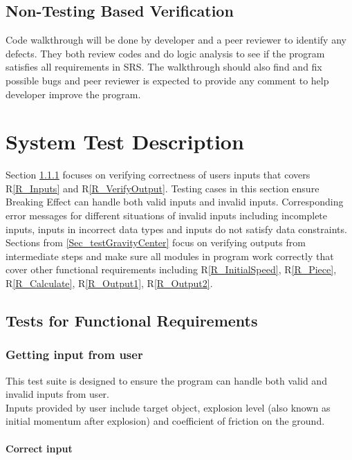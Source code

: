 \documentclass[12pt, titlepage]{article}
\newcommand{\rref}[1]{R\ref{#1}}
\begin{document}

\subsection{Non-Testing Based Verification}
Code walkthrough will be done by developer and a peer reviewer to identify any defects. They both review codes and do logic analysis to see if the program satisfies all requirements in SRS. The walkthrough should also find and fix possible bugs and peer reviewer is expected to provide any comment to help developer improve the program.
\section{System Test Description}

Section \ref{Sec_TestInput} focuses on verifying correctness of users inputs that covers \rref{R_Inputs} and \rref{R_VerifyOutput}. Testing cases in this section ensure Breaking Effect can handle both valid inputs and invalid inputs. Corresponding error messages for different situations of invalid inputs including incomplete inputs, inputs in incorrect data types and inputs do not satisfy data constraints.\\  
Sections from \ref{Sec_testGravityCenter} focus on verifying outputs from intermediate steps and make sure all modules in program work correctly that cover other functional requirements including \rref{R_InitialSpeed}, \rref{R_Piece}, \rref{R_Calculate}, \rref{R_Output1}, \rref{R_Output2}. 

\subsection{Tests for Functional Requirements}

\subsubsection{Getting input from user}
\label{Sec_TestInput}

This test suite is designed to ensure the program can handle both valid and invalid inputs from user.\\ 
Inputs provided by user include target object, explosion level (also known as initial momentum after explosion) and coefficient of friction on the ground. 
		
\paragraph{Correct input}
\end{document}
